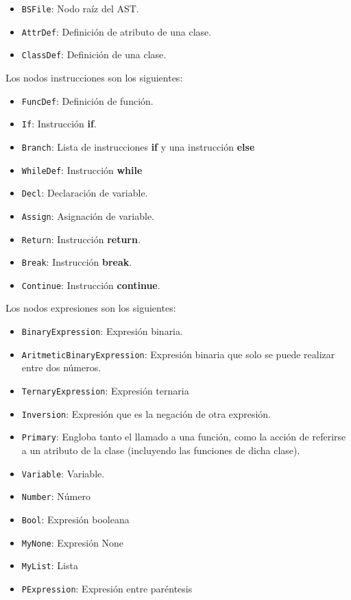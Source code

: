 \begin{itemize}
	\item \verb|BSFile|: Nodo ra\'iz del AST.
	\item \verb|AttrDef|: Definici\'on de atributo de una clase.  
	\item \verb|ClassDef|: Definici\'on de una clase.
\end{itemize}

Los nodos instrucciones son los siguientes:

\begin{itemize}
	\item \verb|FuncDef|: Definici\'on de funci\'on.
	\item \verb|If|: Instrucci\'on \textbf{if}. 
	\item \verb|Branch|: Lista de instrucciones \textbf{if} y una instrucci\'on \textbf{else}
	\item \verb|WhileDef|: Instrucci\'on \textbf{while}
	\item \verb|Decl|: Declaraci\'on de variable.
	\item \verb|Assign|: Asignaci\'on de variable. 
	\item \verb|Return|: Instrucci\'on \textbf{return}.
	\item \verb|Break|: Instrucci\'on \textbf{break}.
	\item \verb|Continue|: Instrucci\'on \textbf{continue}.
\end{itemize}

Los nodos expresiones son los siguientes:

\begin{itemize}
	\item \verb|BinaryExpression|: Expresi\'on binaria.
	\item \verb|AritmeticBinaryExpression|: Expresi\'on binaria que solo se puede realizar entre dos n\'umeros.
	\item \verb|TernaryExpression|: Expresi\'on ternaria
	\item \verb|Inversion|: Expresi\'on que es la negaci\'on de otra expresi\'on.
	\item \verb|Primary|: Engloba tanto el llamado a una funci\'on, como la acci\'on de referirse a un atributo de la clase (incluyendo las funciones de dicha clase).
	\item \verb|Variable|: Variable.
	\item \verb|Number|: N\'umero
	\item \verb|Bool|: Expresi\'on booleana
	\item \verb|MyNone|: Expresi\'on None
	\item \verb|MyList|: Lista
	\item \verb|PExpression|: Expresi\'on entre par\'entesis
\end{itemize}

